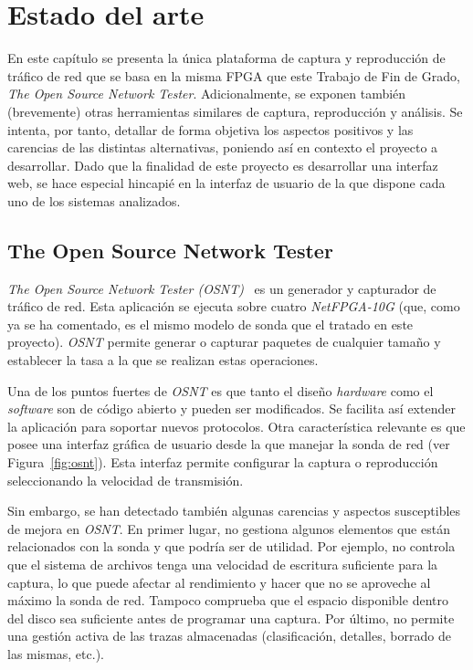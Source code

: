 \chapter{Estado del arte\label{cap:estadoDelArte}}

En este capítulo se presenta la única plataforma de captura y reproducción de tráfico de red que se basa en la misma \gls{FPGA} que este Trabajo de Fin de Grado, \textit{The Open Source Network Tester}.
Adicionalmente, se exponen también (brevemente) otras herramientas similares de captura, reproducción y análisis.
Se intenta, por tanto, detallar de forma objetiva los aspectos positivos y las carencias de las distintas alternativas, poniendo así en contexto el proyecto a desarrollar.
Dado que la finalidad de este proyecto es desarrollar una interfaz web, se hace especial hincapié en la interfaz de usuario de la que dispone cada uno de los sistemas analizados.

\section{The Open Source Network Tester\label{sec:eda:osnt}}

\textit{The Open Source Network Tester (OSNT)}~\cite{osnt} es un generador y capturador de tráfico de red.
Esta aplicación se ejecuta sobre cuatro \textit{NetFPGA-10G} (que, como ya se ha comentado, es el mismo modelo de sonda que el tratado en este proyecto).
\textit{OSNT} permite generar o capturar paquetes de cualquier tamaño y establecer la tasa a la que se realizan estas operaciones.

Una de los puntos fuertes de \textit{OSNT} es que tanto el diseño \textit{hardware} como el \textit{software} son de código abierto y pueden ser modificados.
Se facilita así extender la aplicación para soportar nuevos protocolos.
Otra característica relevante es que posee una interfaz gráfica de usuario desde la que manejar la sonda de red (ver Figura~\ref{fig:osnt}).
Esta interfaz permite configurar la captura o reproducción seleccionando la velocidad de transmisión.

Sin embargo, se han detectado también algunas carencias y aspectos susceptibles de mejora en \textit{OSNT}.
En primer lugar, no gestiona algunos elementos que están relacionados con la sonda y que podría ser de utilidad.
Por ejemplo, no controla que el sistema de archivos tenga una velocidad de escritura suficiente para la captura, lo que puede afectar al rendimiento y hacer que no se aproveche al máximo la sonda de red.
Tampoco comprueba que el espacio disponible dentro del disco sea suficiente antes de programar una captura.
Por último, no permite una gestión activa de las \glspl{traza} almacenadas (clasificación, detalles, borrado de las mismas, etc.).

